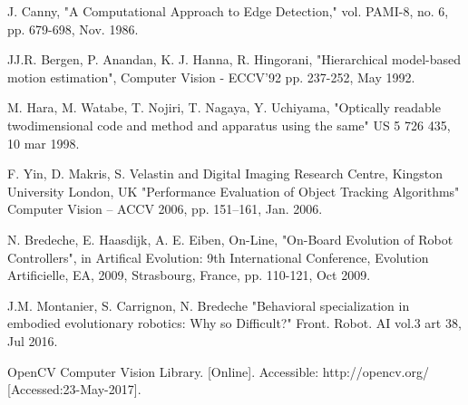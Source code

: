 \documentclass[a4paper]{report}
\begin{document}
\begin{thebibliography}{9}

J. Canny, "A Computational Approach to Edge Detection," vol. PAMI-8, no. 6, pp. 679-698, Nov. 1986.

JJ.R. Bergen, P. Anandan, K. J. Hanna, R. Hingorani, "Hierarchical model-based motion estimation", Computer Vision - ECCV'92 pp. 237-252, May 1992.

M. Hara, M. Watabe, T. Nojiri, T. Nagaya, Y. Uchiyama, "Optically readable twodimensional code and method and apparatus using the same" US 5 726 435, 10 mar 1998.

F. Yin, D. Makris, S. Velastin and Digital Imaging Research Centre, Kingston University
London, UK "Performance Evaluation of Object Tracking Algorithms" Computer Vision – ACCV 2006, pp. 151–161, Jan. 2006.

 N. Bredeche, E. Haasdijk, A. E. Eiben, On-Line, "On-Board Evolution of Robot Controllers", in Artifical Evolution: 9th International Conference, Evolution Artificielle, EA, 2009, Strasbourg, France, pp. 110-121, Oct 2009.

J.M. Montanier, S. Carrignon, N. Bredeche "Behavioral specialization in embodied evolutionary robotics: Why so Difficult?" Front. Robot. AI vol.3 art 38, Jul 2016.

OpenCV Computer Vision Library. [Online]. Accessible: http://opencv.org/ [Accessed:23-May-2017].

\end{thebibliography}
\end{document}
